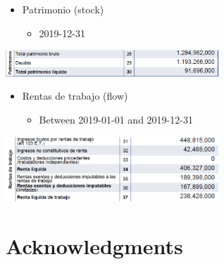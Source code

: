 \documentclass[
  ignorenonframetext,
]{beamer}
\providecommand{\tightlist}{%
  \setlength{\itemsep}{0pt}\setlength{\parskip}{0pt}}\usepackage{longtable,booktabs,array}
\begin{document}
\begin{frame}{}
\label{section-17}
\begin{itemize}
\item
  Patrimonio (stock)

  \begin{itemize}
  \tightlist
  \item
    2019-12-31
  \end{itemize}
\end{itemize}

\begin{center}
\includegraphics[width=0.6\textwidth,height=\textheight]{000_data/001_patrimonio_petro.png}
\end{center}

\begin{itemize}
\item
  Rentas de trabajo (flow)

  \begin{itemize}
  \tightlist
  \item
    Between 2019-01-01 and 2019-12-31
  \end{itemize}
\end{itemize}

\begin{center}
\includegraphics[width=0.6\textwidth,height=\textheight]{000_data/001_rentas_trabajo_petro.png}
\end{center}
\end{frame}

\section{Acknowledgments}\label{acknowledgments}
\end{document}
